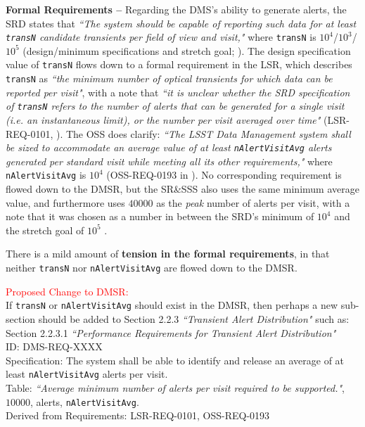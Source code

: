 \documentclass[DM,authoryear,toc]{lsstdoc}
\begin{document}
{\bf Formal Requirements --} Regarding the DMS's ability to generate alerts, the SRD states that {\it ``The system should be capable of reporting such data for at least {\tt transN} candidate transients per field of view and visit,"} where {\tt transN} is $10^4$/$10^3$/$10^5$ (design/minimum specifications and stretch goal; ). The design specification value of {\tt transN} flows down to a formal requirement in the LSR, which describes {\tt transN} as {\it ``the minimum number of optical transients for which data can be reported per visit"}, with a note that {\it ``it is unclear whether the SRD specification of {\tt transN} refers to the number of alerts that can be generated for a single visit (i.e. an instantaneous limit), or the number per visit averaged over time"} (LSR-REQ-0101, ). The OSS does clarify: {\it ``The LSST Data Management system shall be sized to accommodate an average value of at least {\tt nAlertVisitAvg} alerts generated per standard visit while meeting all its other requirements,"} where {\tt nAlertVisitAvg} is $10^4$ (OSS-REQ-0193 in ). No corresponding requirement is flowed down to the DMSR, but the SR\&SSS also uses the same minimum average value, and furthermore uses $40000$ as the {\it peak} number of alerts per visit, with a note that it was chosen as a number in between the SRD's minimum of $10^4$ and the stretch goal of $10^5$ . 

There is a mild amount of {\bf tension in the formal requirements}, in that neither {\tt transN} nor {\tt nAlertVisitAvg} are flowed down to the DMSR. 

\textcolor{red}{Proposed Change to DMSR:} \\
If {\tt transN} or {\tt nAlertVisitAvg} should exist in the DMSR, then perhaps a new sub-section should be added to Section 2.2.3 {\it ``Transient Alert Distribution"} such as: \\
Section 2.2.3.1 {\it ``Performance Requirements for Transient Alert Distribution"} \\
ID: DMS-REQ-XXXX \\ 
Specification: The system shall be able to identify and release an average of at least {\tt nAlertVisitAvg} alerts per visit. \\
Table: {\it ``Average minimum number of alerts per visit required to be supported."}, $10000$, alerts, {\tt nAlertVisitAvg}. \\
Derived from Requirements: LSR-REQ-0101, OSS-REQ-0193
\end{document}
